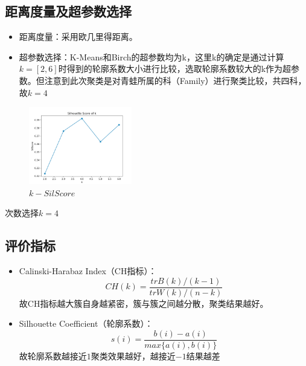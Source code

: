 \documentclass{acm_proc_article-sp}
\begin{document}
\subsection{距离度量及超参数选择}
\begin{itemize}
    \item 距离度量：采用欧几里得距离。
    \item 超参数选择：K-Means和Birch的超参数均为k，这里k的确定是通过计算$k = [2, 6]$时得到的轮廓系数大小进行比较，选取轮廓系数较大的k作为超参数。但注意到此次聚类是对青蛙所属的科（Family）进行聚类比较，共四科，故$k = 4$
\end{itemize}
\begin{figure}[H]
    \centering
    \caption{$k-SilScore$}
    \includegraphics[width=0.4\textwidth]{k.png}
\end{figure}
次数选择$k = 4$

\subsection{评价指标}
\begin{itemize}
    \item Calinski-Harabaz Index（CH指标）：\\
    $$CH(k) = \frac{trB(k)/(k - 1)}{trW(k)/(n - k)}$$
    故CH指标越大簇自身越紧密，簇与簇之间越分散，聚类结果越好。
    \item Silhouette Coefficient（轮廓系数）：\\
    $$s(i) = \frac{b(i) - a(i)}{max\{a(i), b(i)\}}$$
    故轮廓系数越接近$1$聚类效果越好，越接近$-1$结果越差
\end{itemize}
\end{document}
